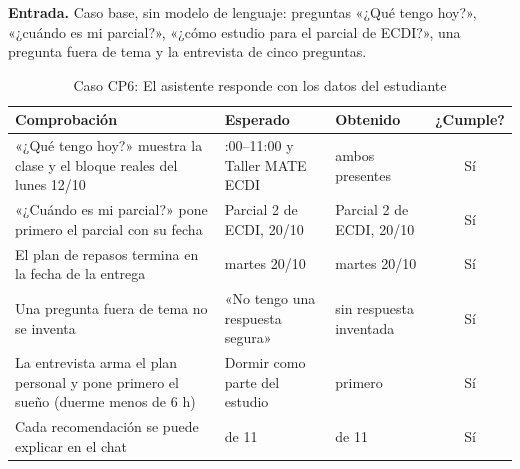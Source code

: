 \textbf{Entrada.} Caso base, sin modelo de lenguaje: preguntas «¿Qué tengo hoy?», «¿cuándo es mi parcial?», «¿cómo estudio para el parcial de ECDI?», una pregunta fuera de tema y la entrevista de cinco preguntas.

\begin{table}[H]
\centering\small
\caption{Caso CP6: El asistente responde con los datos del estudiante}\label{tab:cp6}
\begin{tabularx}{\textwidth}{>{\raggedright\arraybackslash}X >{\raggedright\arraybackslash}p{3.3cm} >{\raggedright\arraybackslash}p{3.3cm} c}
\toprule
Comprobación & Esperado & Obtenido & ¿Cumple? \\
\midrule
«¿Qué tengo hoy?» muestra la clase y el bloque reales del lunes 12/10 & 09:00–11:00 y Taller MATE ECDI & ambos presentes & Sí \\
«¿Cuándo es mi parcial?» pone primero el parcial con su fecha & Parcial 2 de ECDI, 20/10 & Parcial 2 de ECDI, 20/10 & Sí \\
El plan de repasos termina en la fecha de la entrega & martes 20/10 & martes 20/10 & Sí \\
Una pregunta fuera de tema no se inventa & «No tengo una respuesta segura» & sin respuesta inventada & Sí \\
La entrevista arma el plan personal y pone primero el sueño (duerme menos de 6 h) & Dormir como parte del estudio & primero & Sí \\
Cada recomendación se puede explicar en el chat & 11 de 11 & 11 de 11 & Sí \\
\bottomrule
\end{tabularx}
\end{table}
